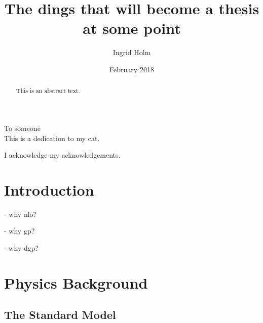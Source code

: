 \documentclass[twoside,english]{uiofysmaster}
\begin{document}
\title{The dings that will become a thesis at some point}
\author{Ingrid Holm}
\date{February 2018}

\maketitle

\begin{abstract}
This is an abstract text.
\end{abstract}

\begin{dedication}
  To someone
  \\\vspace{12pt}
  This is a dedication to my cat.
\end{dedication}

\begin{acknowledgements}
  I acknowledge my acknowledgements.
\end{acknowledgements}

\tableofcontents


\chapter{Introduction}

- why nlo?

- why gp?

- why dgp?


\chapter{Physics Background}

\section{The Standard Model}
\end{document}
